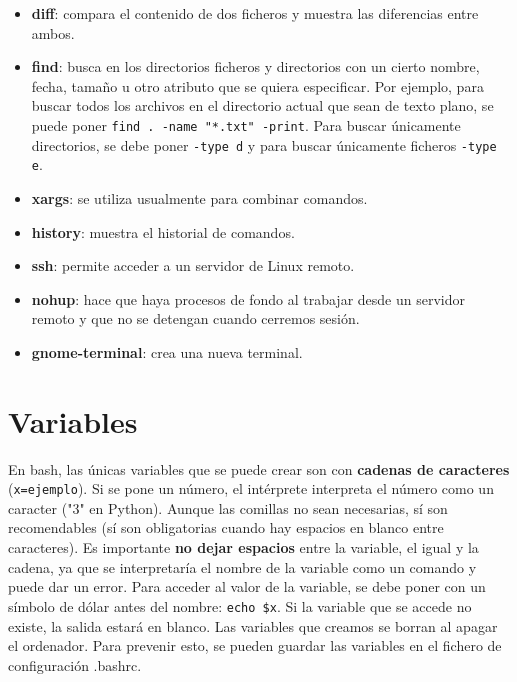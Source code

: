 \begin{itemize}
\item \textbf{diff}: compara el contenido de dos ficheros y muestra las diferencias entre ambos.

\item \textbf{find}: busca en los directorios ficheros y directorios con un cierto nombre, fecha, tamaño u otro atributo que se quiera especificar. Por ejemplo, para buscar todos los archivos en el directorio actual que sean de texto plano, se puede poner \texttt{find . -name "*.txt" -print}. Para buscar únicamente directorios, se debe poner \texttt{-type d} y para buscar únicamente ficheros \texttt{-type e}.

\item \textbf{xargs}: se utiliza usualmente para combinar comandos.

\item \textbf{history}: muestra el historial de comandos.

\item \textbf{ssh}: permite acceder a un servidor de Linux remoto.

\item \textbf{nohup}: hace que haya procesos de fondo al trabajar desde un servidor remoto y que no se detengan cuando cerremos sesión.

\item \textbf{gnome-terminal}: crea una nueva terminal.
\end{itemize}

\section{Variables}
En bash, las únicas variables que se puede crear son con \textbf{cadenas de caracteres} (\texttt{x=ejemplo}). Si se pone un número, el intérprete interpreta el número como un caracter ("3" en Python). Aunque las comillas no sean necesarias, sí son recomendables (sí son obligatorias cuando hay espacios en blanco entre caracteres). Es importante \textbf{no dejar espacios} entre la variable, el igual y la cadena, ya que se interpretaría el nombre de la variable como un comando y puede dar un error. Para acceder al valor de la variable, se debe poner con un símbolo de dólar antes del nombre: \texttt{echo \$x}. Si la variable que se accede no existe, la salida estará en blanco. Las variables que creamos se borran al apagar el ordenador. Para prevenir esto, se pueden guardar las variables en el fichero de configuración .bashrc.

